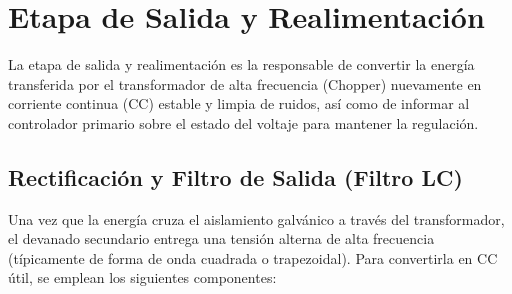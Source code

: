 \documentclass[12pt, a4paper]{article}
\begin{document}
\newpage
\section{Etapa de Salida y Realimentación}

La etapa de salida y realimentación es la responsable de convertir la energía transferida por el transformador de alta frecuencia (Chopper) nuevamente en corriente continua (CC) estable y limpia de ruidos, así como de informar al controlador primario sobre el estado del voltaje para mantener la regulación.

\subsection{Rectificación y Filtro de Salida (Filtro LC)}
Una vez que la energía cruza el aislamiento galvánico a través del transformador, el devanado secundario entrega una tensión alterna de alta frecuencia (típicamente de forma de onda cuadrada o trapezoidal). Para convertirla en CC útil, se emplean los siguientes componentes:
\end{document}

